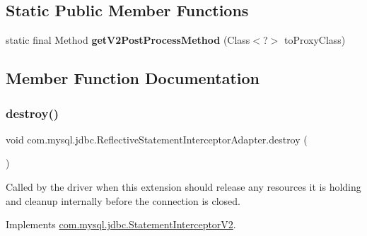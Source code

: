 \subsection*{Static Public Member Functions}
\begin{DoxyCompactItemize}
\item 
\mbox{\label{classcom_1_1mysql_1_1jdbc_1_1_reflective_statement_interceptor_adapter_a1d0f96359a5954cb543db584fc09565a}} 
static final Method {\bfseries get\+V2\+Post\+Process\+Method} (Class$<$?$>$ to\+Proxy\+Class)
\end{DoxyCompactItemize}


\subsection{Member Function Documentation}
\mbox{\label{classcom_1_1mysql_1_1jdbc_1_1_reflective_statement_interceptor_adapter_aa04ad6c4f60c2b7339f5dcb07ba9407a}} 
\subsubsection{\texorpdfstring{destroy()}{destroy()}}
{\footnotesize\ttfamily void com.\+mysql.\+jdbc.\+Reflective\+Statement\+Interceptor\+Adapter.\+destroy (\begin{DoxyParamCaption}{ }\end{DoxyParamCaption})}

Called by the driver when this extension should release any resources it is holding and cleanup internally before the connection is closed. 

Implements \mbox{\hyperlink{interfacecom_1_1mysql_1_1jdbc_1_1_statement_interceptor_v2_a00bfb3d3f7b81e16a9cdf4784150c3f7}{com.\+mysql.\+jdbc.\+Statement\+Interceptor\+V2}}.

